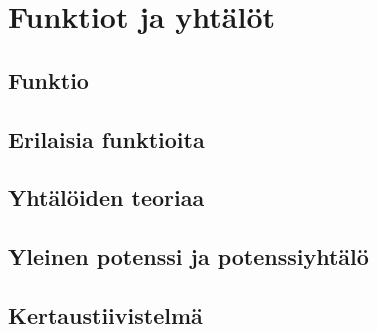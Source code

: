 %
\part{Funktiot ja yhtälöt}
\chapter{Funktio}
\chapter{Erilaisia funktioita}
\chapter{Yhtälöiden teoriaa}
\chapter{Yleinen potenssi ja potenssiyhtälö}
\chapter{Kertaustiivistelmä}
